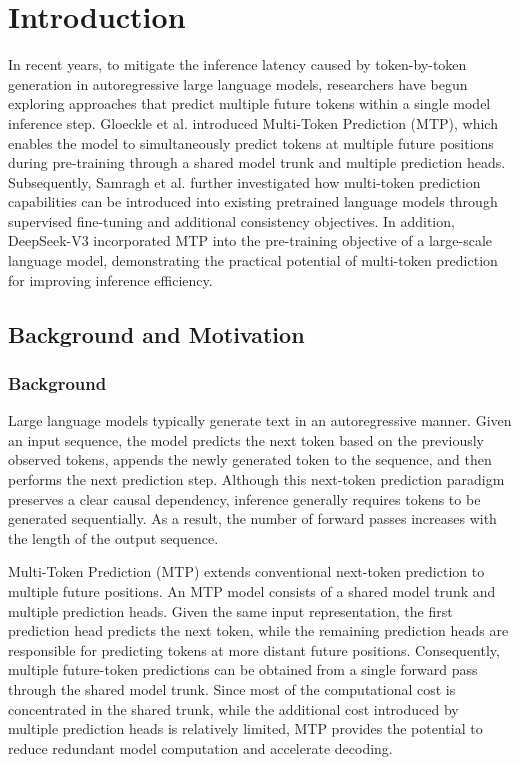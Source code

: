 
\chapter{Introduction}\label{chap:intro}

In recent years, to mitigate the inference latency caused by token-by-token generation in autoregressive large language models, researchers have begun exploring approaches that predict multiple future tokens within a single model inference step. Gloeckle et al.\cite{gloeckle2024mtp} introduced Multi-Token Prediction (MTP), which enables the model to simultaneously predict tokens at multiple future positions during pre-training through a shared model trunk and multiple prediction heads. Subsequently, Samragh et al.\cite{samragh2025future} further investigated how multi-token prediction capabilities can be introduced into existing pretrained language models through supervised fine-tuning and additional consistency objectives. In addition, DeepSeek-V3\cite{deepseekai2024deepseekv3} incorporated MTP into the pre-training objective of a large-scale language model, demonstrating the practical potential of multi-token prediction for improving inference efficiency.

\section{Background and Motivation}\label{sec:1-motivation}

\subsection{Background}

Large language models typically generate text in an autoregressive manner. Given an input sequence, the model predicts the next token based on the previously observed tokens, appends the newly generated token to the sequence, and then performs the next prediction step. Although this next-token prediction paradigm preserves a clear causal dependency, inference generally requires tokens to be generated sequentially. As a result, the number of forward passes increases with the length of the output sequence.

Multi-Token Prediction (MTP) extends conventional next-token prediction to multiple future positions. An MTP model consists of a shared model trunk and multiple prediction heads. Given the same input representation, the first prediction head predicts the next token, while the remaining prediction heads are responsible for predicting tokens at more distant future positions. Consequently, multiple future-token predictions can be obtained from a single forward pass through the shared model trunk. Since most of the computational cost is concentrated in the shared trunk, while the additional cost introduced by multiple prediction heads is relatively limited, MTP provides the potential to reduce redundant model computation and accelerate decoding.

